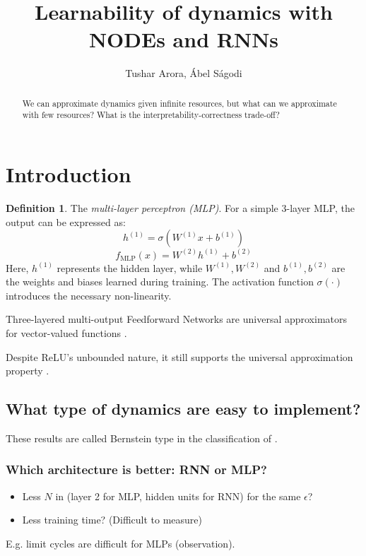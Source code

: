 \documentclass{article} %
\title{Learnability of dynamics with NODEs and RNNs}
\author{
    Tushar Arora, \'Abel S\'agodi
}
\theoremstyle{definition} \newtheorem{definition}{Definition}
\theoremstyle{remark} \newtheorem{remark}{Remark}
\begin{document}
\maketitle
\begin{abstract}
We can approximate dynamics given infinite resources, but what can we approximate with few resources?
What is the interpretability-correctness trade-off?
\end{abstract}

\section{Introduction}


\begin{definition}
The \textit{multi-layer perceptron (MLP)}. For a simple 3-layer MLP, the output can be expressed as:
\[
h^{(1)} = \sigma(W^{(1)} x + b^{(1)})
\]
\[
f_{\text{MLP}}(x) = W^{(2)} h^{(1)} + b^{(2)}
\]
Here, \(h^{(1)}\) represents the hidden layer, while \(W^{(1)}, W^{(2)}\) and \(b^{(1)}, b^{(2)}\) are the weights and biases learned during training. The activation function \(\sigma(\cdot)\) introduces the necessary non-linearity.
\end{definition}

Three-layered multi-output Feedforward Networks are universal approximators for vector-valued functions \citep{irie1988capabilities}.

Despite ReLU's unbounded nature, it still supports the universal approximation property \citep{yarotsky2017error}.



\subsection{What type of dynamics are easy to implement?}
These results are called Bernstein type in the classification of \cite{jiang2023brief}.


\subsubsection{Which architecture is better: RNN or MLP?}
\begin{itemize}
\item Less $N$ in (layer 2 for MLP, hidden units for RNN) for the same $\epsilon$?
\item Less training time? (Difficult to measure)
\end{itemize}

E.g. limit cycles are difficult for MLPs (observation).
\end{document}
